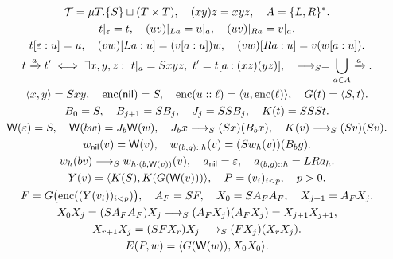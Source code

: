 \documentclass[10pt,letterpaper]{article}
\newcommand{\T}{\mathcal T}
\newcommand{\eps}{\varepsilon}
\newcommand{\pair}[2]{\langle #1,#2\rangle}
\newcommand{\R}{\longrightarrow_{S}}
\newcommand{\wt}{\mathsf W}
\begin{document}
\begin{center}
  \large\PaperAuthors
\end{center}
\begin{gather}
\T=\mu T.\{S\}\sqcup(T\times T),\quad  (xy)z=xyz,\quad  A=\{L,R\}^{*}.\\
t|_\eps=t,\quad (uv)|_{La}=u|_a,\quad (uv)|_{Ra}=v|_a.\\
t[\eps:u]=u,\quad (vw)[La:u]=(v[a:u])w,\quad (vw)[Ra:u]=v(w[a:u]).\\
t\xrightarrow{a}t'\iff \exists x,y,z:\ t|_a=Sxyz,\ t'=t[a:(xz)(yz)],\quad
\R=\bigcup_{a\in A}\xrightarrow{a}.\\
\pair{x}{y}=Sxy,\quad \operatorname{enc}(\mathsf{nil})=S,\quad \operatorname{enc}(u::\ell)=\pair u{\operatorname{enc}(\ell)},\quad
G(t)=\pair S t. \label{sym:5}\\
B_0=S,\quad B_{j+1}=SB_j,\quad J_j=SSB_j,\quad K(t)=SSSt.\notag\\
\wt(\eps)=S,\quad \wt(bw)=J_b\wt(w),\quad
 J_bx\R(Sx)(B_bx),\quad
 K(v)\R(Sv)(Sv). \label{sym:6}\\
w_{\mathsf{nil}}(v)=\wt(v),\quad
 w_{(b,g)::h}(v)=(S w_h(v))(B_b g). \notag\\
w_h(bv)\R w_{h\cdot(b,\wt(v))}(v),\quad
 a_{\mathsf{nil}}=\eps,\quad a_{(b,g)::h}=LRa_h. \label{sym:7}\\
Y(v)=\pair{K(S)}{K(G(\wt(v)))},\quad
P=(v_i)_{i<p},\quad p>0.\notag\\
F=G\bigl(\operatorname{enc}((Y(v_i))_{i<p})\bigr),\quad  A_F=SF,\quad X_0=SA_FA_F,\quad X_{j+1}=A_FX_j.\label{sym:8}\\
X_0X_j=(SA_FA_F)X_j\R(A_FX_j)(A_FX_j)=X_{j+1}X_{j+1}, \label{sym:9}\\
X_{r+1}X_j=(SFX_r)X_j\R (FX_j)(X_rX_j). \label{sym:10}\\
E(P,w)=\pair{G(\wt(w))}{X_0X_0}. \label{sym:11}
\end{gather}
\end{document}
